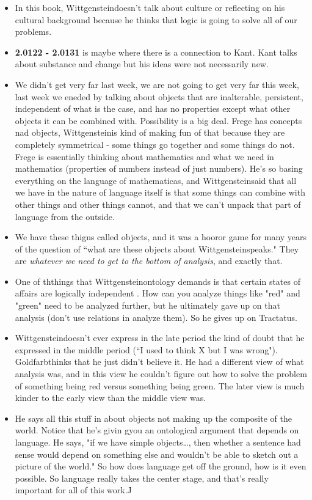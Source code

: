 \documentclass[12pt]{article}
\theoremstyle{definition}
\newcommand{\w}{Wittgenstein}
\newcommand{\T}{Tractatus}
\newcommand{\g}{Goldfarb}
\begin{document}
\begin{itemize}
    \item In this book, \w doesn't talk about culture or reflecting on his cultural background because he thinks that logic is going to solve all of our problems.
    \item \textbf{2.0122 - 2.0131} is maybe where there is a connection to Kant. Kant talks about substance and change but his ideas were not necessarily new.
    \item We didn't get very far last week, we are not going to get very far this week, last week we eneded by talking about objects that are inalterable, persistent, independent of what is the case, and has no properties except what other objects it can be combined with. Possibility is a big deal. Frege has concepts nad objects, \w is kind of making fun of that because they are completely symmetrical - some things go together and some things do not. Frege is essentially thinking about mathematics and what we need in mathematics (properties of numbers instead of just numbers). He's so basing everything on the language of mathematicas, and \w said that all we have in the nature of language itself is that some things can combine with other things and other things cannot, and that we can't unpack that part of language from the outside.
    \item We have these thigns called objects, and it was a hooror game for many years of the question of ``what are these objects about \w speaks." They are \textit{whatever we need to get to the bottom of analysis}, and exactly that.
    \item One of ththings that \w ontology demands is that certain states of affairs are logically independent . How can you analyze things like "red" and "green" need to be analyzed further, but he ultimately gave up on that analysis (don't use relations in analyze them). So he gives up on \T.
    \item \w doesn't ever express in the late period the kind of doubt that he expressed in the middle period (``I used to think X but I was wrong"). \g thinks that he just didn't believe it. He had a different view of what analysis was, and in this view he couldn't figure out how to solve the problem of something being red versus something being green. The later view is much kinder to the early view than the middle view was.
    \item He says all this stuff in about objects not making up the composite of the world. Notice that he's givin gyou an ontological argument that depends on language. He says, "if we have simple objects\ldots, then whether a sentence had sense would depend on something else and wouldn't be able to sketch out a picture of the world." So how does language get off the ground, how is it even possible. So language really takes the center stage, and that's really important for all of this work.J

\end{itemize}
\end{document}
